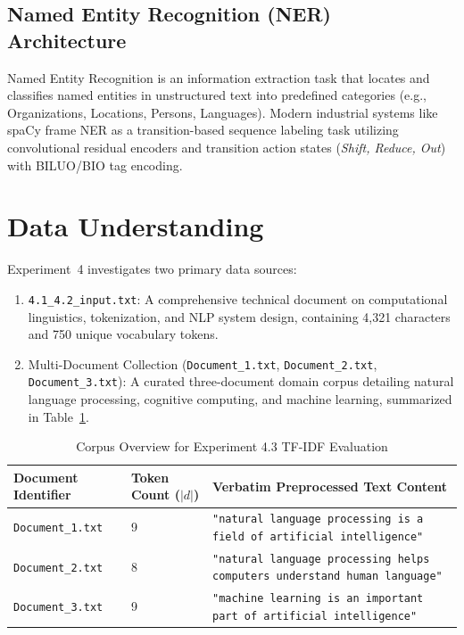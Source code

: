 \subsection{Named Entity Recognition (NER) Architecture}
Named Entity Recognition is an information extraction task that locates and classifies named entities in unstructured text into predefined categories (e.g., Organizations, Locations, Persons, Languages). Modern industrial systems like spaCy frame NER as a transition-based sequence labeling task utilizing convolutional residual encoders and transition action states (\textit{Shift, Reduce, Out}) with BILUO/BIO tag encoding.

\section{Data Understanding}
Experiment~4 investigates two primary data sources:
\begin{enumerate}
    \item \texttt{4.1\_4.2\_input.txt}: A comprehensive technical document on computational linguistics, tokenization, and NLP system design, containing 4,321 characters and 750 unique vocabulary tokens.
    \item Multi-Document Collection (\texttt{Document\_1.txt}, \texttt{Document\_2.txt}, \texttt{Document\_3.txt}): A curated three-document domain corpus detailing natural language processing, cognitive computing, and machine learning, summarized in Table~\ref{tab:exp4_docs_summary}.
\end{enumerate}

\begin{table}[H]
\centering
\small
\caption{Corpus Overview for Experiment 4.3 TF-IDF Evaluation}
\label{tab:exp4_docs_summary}
\begin{tabularx}{\textwidth}{lp{2cm}X}
\toprule
\textbf{Document Identifier} & \textbf{Token Count ($|d|$)} & \textbf{Verbatim Preprocessed Text Content} \\
\midrule
\texttt{Document\_1.txt} & 9 & \texttt{"natural language processing is a field of artificial intelligence"} \\
\texttt{Document\_2.txt} & 8 & \texttt{"natural language processing helps computers understand human language"} \\
\texttt{Document\_3.txt} & 9 & \texttt{"machine learning is an important part of artificial intelligence"} \\
\bottomrule
\end{tabularx}
\end{table}

